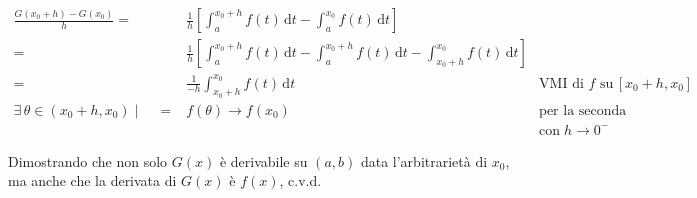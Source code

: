 \documentclass[../dimostrazioni]{subfiles}
\begin{document}
                            \begin{align*}
                                \frac{G(x_0+h) - G(x_0)}{h} =& \frac{1}{h} \left[ \int_a^{x_0+h} \! f(t) \, \mathrm{d}t - \int_a^{x_0} \! f(t) \, \mathrm{d}t \right] \\
                                                            =& \frac{1}{h} \left[ \int_a^{x_0+h} \! f(t) \, \mathrm{d}t - \int_a^{x_0+h} \! f(t) \, \mathrm{d}t - \int_{x_0+h}^{x_0} \! f(t) \, \mathrm{d}t \right] \\
                                                            =& \frac{1}{-h} \int_{x_0+h}^{x_0} \! f(t) \, \mathrm{d}t & \text{VMI di \(f\) su} \, [x_0 + h, x_0]\\
                                \exists \, \theta \in (x_0+h, x_0) \mid \quad =& f(\theta) \longrightarrow f(x_0)          & \text{per la seconda proprietà del VMI}& \\
                                &                            &  \text{con} \; h \rightarrow 0^-&
                            \end{align*}
                            
                            Dimostrando che non solo \(G(x)\) è derivabile su \((a,b)\) data l'arbitrarietà di \(x_0\), 
                            ma anche che la derivata di \(G(x)\) è \(f(x)\), c.v.d.          
\end{document}
